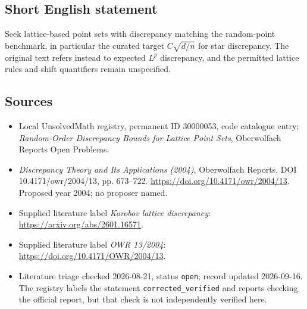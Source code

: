 \documentclass[11pt]{article}
\begin{document}
\subsection{Short English statement}
Seek lattice-based point sets with discrepancy matching the random-point benchmark, in particular the curated target \(C\sqrt{d/n}\) for star discrepancy. The original text refers instead to expected \(L^p\) discrepancy, and the permitted lattice rules and shift quantifiers remain unspecified.
\subsection{Sources}
\begin{itemize}\item Local UnsolvedMath registry, permanent ID 30000053, code catalogue entry; \emph{Random-Order Discrepancy Bounds for Lattice Point Sets}, Oberwolfach Reports Open Problems.\item \emph{Discrepancy Theory and Its Applications (2004)}, Oberwolfach Reports, DOI 10.4171/owr/2004/13, pp. 673--722. \url{https://doi.org/10.4171/owr/2004/13}. Proposed year 2004; no proposer named.\item Supplied literature label \emph{Korobov lattice discrepancy}: \url{https://arxiv.org/abs/2601.16571}.\item Supplied literature label \emph{OWR 13/2004}: \url{https://doi.org/10.4171/OWR/2004/13}.\item Literature triage checked 2026-08-21, status \texttt{open}; record updated 2026-09-16. The registry labels the statement \texttt{corrected\_verified} and reports checking the official report, but that check is not independently verified here.\end{itemize}
\end{document}
